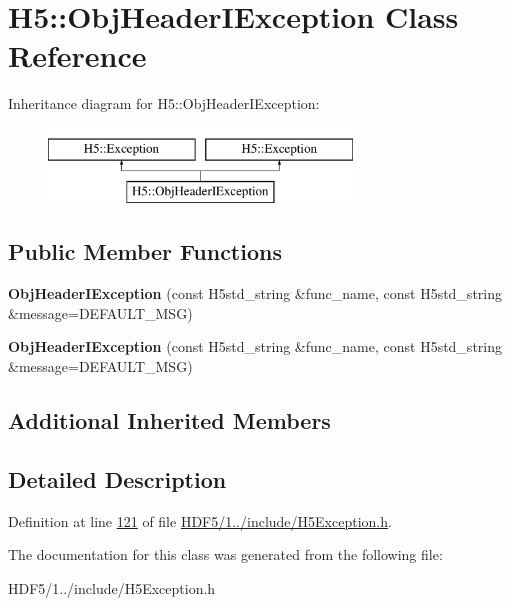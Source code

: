 \hypertarget{class_h5_1_1_obj_header_i_exception}{}\section{H5\+:\+:Obj\+Header\+I\+Exception Class Reference}
\label{class_h5_1_1_obj_header_i_exception}
Inheritance diagram for H5\+:\+:Obj\+Header\+I\+Exception\+:\begin{figure}[H]
\begin{center}
\leavevmode
\includegraphics[height=2.000000cm]{class_h5_1_1_obj_header_i_exception}
\end{center}
\end{figure}
\subsection*{Public Member Functions}
\begin{DoxyCompactItemize}
\item 
\mbox{\label{class_h5_1_1_obj_header_i_exception_af9008599955a7294867c0416240e0fd1}} 
{\bfseries Obj\+Header\+I\+Exception} (const H5std\+\_\+string \&func\+\_\+name, const H5std\+\_\+string \&message=D\+E\+F\+A\+U\+L\+T\+\_\+\+M\+SG)
\item 
\mbox{\label{class_h5_1_1_obj_header_i_exception_af9008599955a7294867c0416240e0fd1}} 
{\bfseries Obj\+Header\+I\+Exception} (const H5std\+\_\+string \&func\+\_\+name, const H5std\+\_\+string \&message=D\+E\+F\+A\+U\+L\+T\+\_\+\+M\+SG)
\end{DoxyCompactItemize}
\subsection*{Additional Inherited Members}


\subsection{Detailed Description}


Definition at line \hyperlink{_h_d_f5_21_810_81_2include_2_h5_exception_8h_source_l00121}{121} of file \hyperlink{_h_d_f5_21_810_81_2include_2_h5_exception_8h_source}{H\+D\+F5/1../include/\+H5\+Exception.\+h}.



The documentation for this class was generated from the following file\+:\begin{DoxyCompactItemize}
\item 
H\+D\+F5/1../include/\+H5\+Exception.\+h\end{DoxyCompactItemize}
